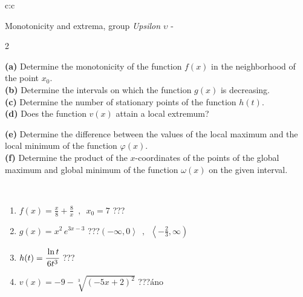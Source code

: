 \documentclass[10pt]{report}
\begin{document}
\begin{tabular}{c:c}
\begin{minipage}[c][104.5mm][t]{0.5\linewidth}
\begin{center}
\vspace{5mm}
{\huge Monotonicity and extrema, group \textit{Upsilon $\upsilon$} -}\\[5mm]
\begin{minipage}{0.95\linewidth}
\begin{center}
{\small \begin{multicols}{2} \raggedright
\textbf{(a)} Determine the monotonicity of the function \(f(x)\) in the neighborhood of the point \(x_0\). \\[1mm]
\textbf{(b)} Determine the intervals on which the function \(g(x)\) is decreasing. \\[1mm]
\textbf{(c)} Determine the number of stationary points of the function \(h(t)\). \\[1mm]
\textbf{(d)} Does the function \(v(x)\) attain a local extremum? \par \columnbreak
\textbf{(e)} Determine the difference between the values of the local maximum and the local minimum of the function \(\varphi(x)\). \\[1mm]
\textbf{(f)} Determine the product of the \(x\)-coordinates of the points of the global maximum and global minimum of the function \(\omega(x)\) on the given interval. \\[1mm]
\end{multicols}
}
\end{center}
\end{minipage}
\\[1mm]
\begin{minipage}{0.79\linewidth}
\begin{center}
\begin{varwidth}{\linewidth}
\setlength{\itemsep}{0pt}
\begin{enumerate}
\normalsize
\item $f(x)=\frac{x}{8}+\frac{8}{x} \enspace , \enspace x_0=7$\quad \dotfill\; ???\;\dotfill \quad {}
\item $g(x)=x^2\, e^{3x-3}$\quad \dotfill\; ???\;\dotfill \quad $\left(-\infty , 0\right\rangle\enspace , \enspace \left\langle-\frac{2}{3} , \infty\right)$
\item $h(t)=\cfrac{\ln t}{6t^3}$\quad \dotfill\; ???\;\dotfill {}
\item $v(x)=-9-\sqrt[3]{(-5x+2)^2}$\quad \dotfill\; ???\;\dotfill \quad $\text{áno}$

\end{enumerate}
\end{varwidth}
\end{center}
\end{minipage}
\end{center}
\end{minipage}
\end{tabular}
\end{document}
